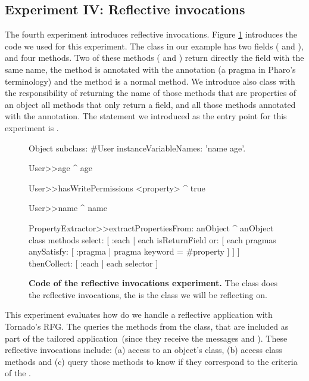 \subsection*{Experiment IV: Reflective invocations} \label{sec:results_helloworld}

The fourth experiment introduces reflective invocations. Figure \ref{fig:reflective_invocations} introduces the code we used for this experiment. The  class in our example has two fields ( and ), and four methods. Two of these methods ( and ) return directly the field with the same name, the method  is annotated with the  annotation (a pragma in Pharo's terminology) and the method  is a normal method. We introduce also  class with the responsibility of returning the name of those methods that are properties of an object \ie all methods that only return a field, and all those methods annotated with the  annotation. The statement we introduced as the entry point for this experiment is .

\begin{figure}[ht]
\begin{code}
Object subclass: #User
	instanceVariableNames: 'name age'.

User>>age
	^ age

User>>hasWritePermissions
	<property>
	^ true

User>>name
	^ name

PropertyExtractor>>extractPropertiesFrom: anObject
	^ anObject class methods
		select: [ :each | each isReturnField
			or: [ each pragmas anySatisfy: [ :pragma | pragma keyword = #property ] ] ]
		thenCollect: [ :each | each selector ]

\end{code}
\caption{ \textbf{Code of the reflective invocations experiment.} The  class does the reflective invocations, the  is the class we will be reflecting on.\label{fig:reflective_invocations}}
\end{figure}

This experiment evaluates how do we handle a reflective application with Tornado's RFG. The  queries the methods from the  class, that are included as part of the tailored application~(since they receive the messages  and ). These reflective invocations include: (a) access to an object's class, (b) access class methods and (c) query those methods to know if they correspond to the criteria of the .

